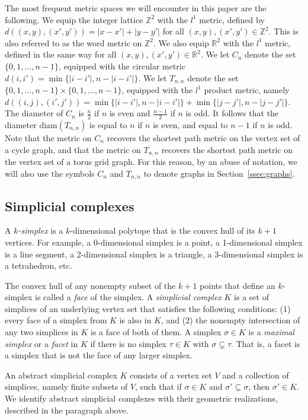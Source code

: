 \documentclass[12pt,a4paper]{amsart}
\theoremstyle{definition}
\newcommand{\R}{\ensuremath{\mathbb{R}}}
\newcommand{\Z}{\ensuremath{\mathbb{Z}}}
\newcommand{\diam}{\ensuremath{\mathrm{diam}}}
\numberwithin{equation}{section}
\begin{document}
The most frequent metric spaces we will encounter in this paper are the following.
We equip the integer lattice $\Z^2$ with the $l^1$ metric, defined by $d((x,y),(x',y'))=|x-x'|+|y-y'|$ for all $(x,y),(x',y')\in \Z^2$.
This is also referred to as the word metric on $\Z^2$.
We also equip $\R^2$ with the $l^1$ metric, defined in the same way for all $(x,y),(x',y')\in \R^2$.
We let $C_n$ denote the set $\{0,1,\ldots,n-1\}$, equipped with the circular metric $d(i,i')=\min\{|i-i'|,n-|i-i'|\}$.
We let $T_{n,n}$ denote the set $\{0,1,\ldots,n-1\} \times \{0,1,\ldots,n-1\}$, equipped with the $l^1$ product metric, namely $d((i,j),(i',j'))=\min\{|i-i'|,n-|i-i'|\}+\min\{|j-j'|,n-|j-j'|\}$.
The diameter of $C_n$ is $\frac{n}{2}$ if $n$ is even and $\frac{n-1}{2}$ if $n$ is odd.
It follows that the diameter $\diam(T_{n,n})$ is equal to $n$ if $n$ is even, and equal to $n-1$ if $n$ is odd.
Note that the metric on $C_n$ recovers the shortest path metric on the vertex set of a cycle graph, and that the metric on $T_{n,n}$ recovers the shortest path metric on the vertex set of a torus grid graph.
For this reason, by an abuse of notation, we will also use the symbols $C_n$ and $T_{n,n}$ to denote graphs in Section~\ref{ssec:graphs}.



\subsection{Simplicial complexes}
A \emph{$k$-simplex} is a $k$-dimensional polytope that is the convex hull of its $k + 1$ vertices.
For example, a 0-dimensional simplex is a point, a 1-dimensional simplex is a line segment, a 2-dimensional simplex is a triangle, a 3-dimensional simplex is a tetrahedron, etc.

The convex hull of any nonempty subset of the $k + 1$ points that define an $k$-simplex is called a \emph{face} of the simplex.
%
A \emph{simplicial complex} $K$ is a set of simplices of an underlying vertex set that satisfies the following conditions: 
(1) every face of a simplex from $K$ is also in $K$, and 
(2) the nonempty intersection of any two simplices in $K$ is a face of both of them.
A simplex $\sigma\in K$ is a \emph{maximal simplex} or a \emph{facet} in $K$ if there is no simplex $\tau\in K$ with $\sigma\subsetneq\tau$.
That is, a facet is a simplex that is not the face of any larger simplex.

An abstract simplicial complex $K$ consists of a vertex set $V$ and a collection of simplices, namely finite subsets of $V$, such that if $\sigma\in K$ and $\sigma'\subseteq \sigma$, then $\sigma'\in K$.
We identify abstract simplicial complexes with their geometric realizations, described in the paragraph above.
\end{document}
